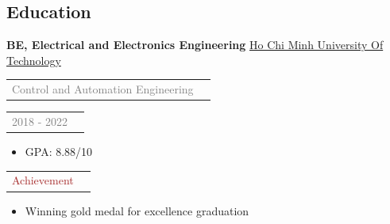 \documentclass[11pt]{article}
\begin{document}
\subsection*{Education}
\textbf{BE, Electrical and Electronics Engineering} \underline{Ho Chi Minh University Of Technology}
\begin{tabular}{ll}
\textcolor{gray}{Control and Automation Engineering} 
\end{tabular}
\begin{tabular}{ll}
\textcolor{gray}{2018 - 2022} 
\end{tabular}
\begin{itemize}
    \item GPA: 8.88/10
\end{itemize}
\begin{tabular}{ll}
\textcolor{brown}{Achievement} 
\end{tabular}
\begin{itemize}
    \item Winning gold medal for excellence graduation
\end{itemize}
\end{document}
